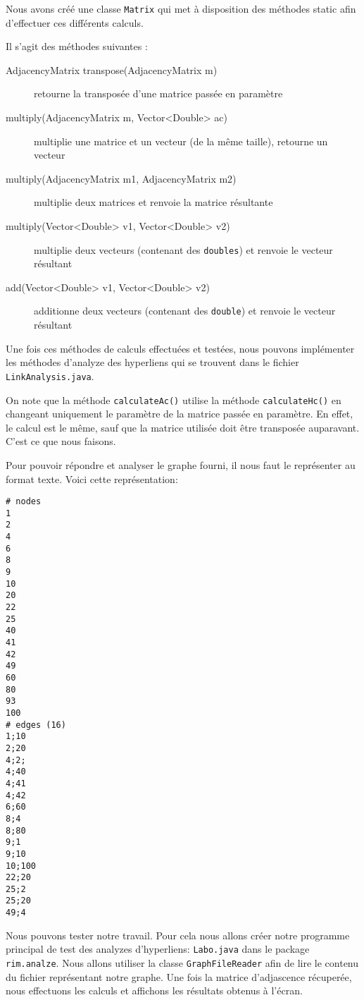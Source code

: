 \documentclass[a4paper, 11pt]{article}
\begin{document}
Nous avons créé une classe \texttt{Matrix} qui met à disposition des méthodes
static afin d'effectuer ces différents calculs.

Il s'agit des méthodes suivantes : 

\begin{description}
\item[AdjacencyMatrix transpose(AdjacencyMatrix m)] retourne la transposée
d'une matrice passée en paramètre
\item[multiply(AdjacencyMatrix m, Vector<Double> ac)] multiplie
une matrice et un vecteur (de la même taille), retourne un vecteur
\item[multiply(AdjacencyMatrix m1, AdjacencyMatrix m2)] multiplie deux matrices
et renvoie la matrice résultante
\item[multiply(Vector<Double> v1, Vector<Double> v2)] multiplie deux vecteurs
(contenant des \texttt{doubles}) et renvoie le vecteur résultant
\item[add(Vector<Double> v1, Vector<Double> v2)] additionne deux vecteurs
(contenant des \texttt{double}) et renvoie le vecteur résultant
\end{description}

Une fois ces méthodes de calculs effectuées et testées, nous pouvons implémenter
les méthodes d'analyze des hyperliens qui se trouvent dans le fichier
\texttt{LinkAnalysis.java}.

On note que la méthode \texttt{calculateAc()} utilise la méthode
\texttt{calculateHc()} en changeant uniquement le paramètre de la matrice
passée en paramètre. En effet, le calcul est le même, sauf que la matrice
utilisée doit être transposée auparavant. C'est ce que nous faisons.

Pour pouvoir répondre et analyser le graphe fourni, il nous faut le représenter
au format texte. Voici cette représentation:

\begin{verbatim}
# nodes
1
2
4
6
8
9
10
20
22
25
40
41
42
49
60
80
93
100
# edges (16)
1;10
2;20
4;2;
4;40
4;41
4;42
6;60
8;4
8;80
9;1
9;10
10;100
22;20
25;2
25;20
49;4
\end{verbatim}


Nous pouvons tester notre travail. Pour cela nous allons créer notre programme
principal de test des analyzes d'hyperliens: \texttt{Labo.java} dans le package
\texttt{rim.analze}. Nous allons utiliser la classe \texttt{GraphFileReader}
afin de lire le contenu du fichier représentant notre graphe. Une fois la
matrice d'adjascence récuperée, nous effectuons les calculs et affichons les
résultats obtenus à l'écran. 
\end{document}
